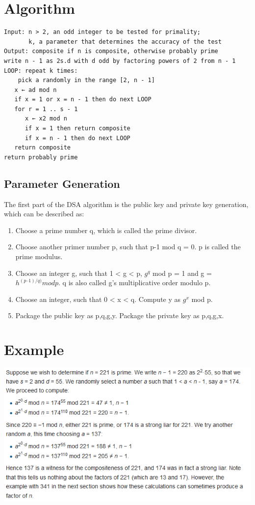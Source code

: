 \documentclass[a4paper,12pt]{article}
\newenvironment{codeblock}{\fontfamily{pcr}\selectfont}{\par}
\begin{document}
\section{Algorithm}
	
  \begin{verbatim}
Input: n > 2, an odd integer to be tested for primality;
       k, a parameter that determines the accuracy of the test
Output: composite if n is composite, otherwise probably prime
write n - 1 as 2s.d with d odd by factoring powers of 2 from n - 1
LOOP: repeat k times: 
    pick a randomly in the range [2, n - 1] 
   x ← ad mod n 
   if x = 1 or x = n - 1 then do next LOOP 
   for r = 1 .. s - 1 
      x ← x2 mod n 
      if x = 1 then return composite 
      if x = n - 1 then do next LOOP 
   return composite 
return probably prime

  \end{verbatim}
  \subsection{Parameter Generation}
  The first part of the DSA algorithm is the public key and private key generation, which can be described as: 
    \begin{codeblock}
    \begin{enumerate}
        \item Choose a prime number q, which is called the prime divisor.
        \item Choose another primer number p, such that p-1 mod q = 0. p is called the prime modulus.
        \item Choose an integer g, such that 1 < g < p, $g^{q}$ mod p = 1 and g = $h^{(p–1)/q)} mod p$. q is also called g's multiplicative order modulo p.
        \item Choose an integer, such that 0 < x < q.
    Compute y as $g^{x}$ mod p.
    	\item Package the public key as {p,q,g,y}.
    Package the private key as {p,q,g,x}.
	\end{enumerate}
    \end{codeblock}
    
  
\section{Example}
	\includegraphics[width=\textwidth]{rabin_example}
\end{document}
